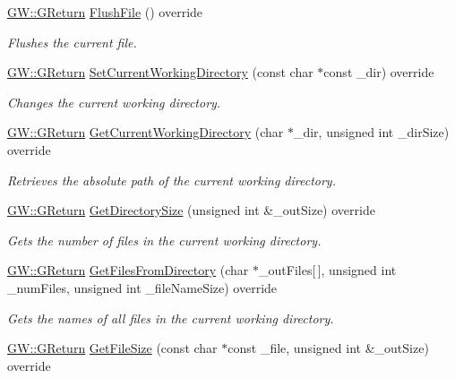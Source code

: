 \begin{DoxyCompactItemize}
\hyperlink{namespaceGW_a67a839e3df7ea8a5c5686613a7a3de21}{G\+W\+::\+G\+Return} \hyperlink{classFileIO_a8e5afdb1a734f37e422ff0147561a3a1}{Flush\+File} () override
\begin{DoxyCompactList}\small\item\em Flushes the current file. \end{DoxyCompactList}\item 
\hyperlink{namespaceGW_a67a839e3df7ea8a5c5686613a7a3de21}{G\+W\+::\+G\+Return} \hyperlink{classFileIO_a8332ededccf4034fd83509d9513a2635}{Set\+Current\+Working\+Directory} (const char $\ast$const \+\_\+dir) override
\begin{DoxyCompactList}\small\item\em Changes the current working directory. \end{DoxyCompactList}\item 
\hyperlink{namespaceGW_a67a839e3df7ea8a5c5686613a7a3de21}{G\+W\+::\+G\+Return} \hyperlink{classFileIO_a41a1859ffe3ebd76005f264af0b1ea66}{Get\+Current\+Working\+Directory} (char $\ast$\+\_\+dir, unsigned int \+\_\+dir\+Size) override
\begin{DoxyCompactList}\small\item\em Retrieves the absolute path of the current working directory. \end{DoxyCompactList}\item 
\hyperlink{namespaceGW_a67a839e3df7ea8a5c5686613a7a3de21}{G\+W\+::\+G\+Return} \hyperlink{classFileIO_ae331f6c02948720d9cc5bcd2700d8cf7}{Get\+Directory\+Size} (unsigned int \&\+\_\+out\+Size) override
\begin{DoxyCompactList}\small\item\em Gets the number of files in the current working directory. \end{DoxyCompactList}\item 
\hyperlink{namespaceGW_a67a839e3df7ea8a5c5686613a7a3de21}{G\+W\+::\+G\+Return} \hyperlink{classFileIO_afd1b77afed3d853aaa01f14ecbc6b0e0}{Get\+Files\+From\+Directory} (char $\ast$\+\_\+out\+Files\mbox{[}$\,$\mbox{]}, unsigned int \+\_\+num\+Files, unsigned int \+\_\+file\+Name\+Size) override
\begin{DoxyCompactList}\small\item\em Gets the names of all files in the current working directory. \end{DoxyCompactList}\item 
\hyperlink{namespaceGW_a67a839e3df7ea8a5c5686613a7a3de21}{G\+W\+::\+G\+Return} \hyperlink{classFileIO_a91ee3ceabd5d6097eed85466c26d2adb}{Get\+File\+Size} (const char $\ast$const \+\_\+file, unsigned int \&\+\_\+out\+Size) override

\end{DoxyCompactItemize}
